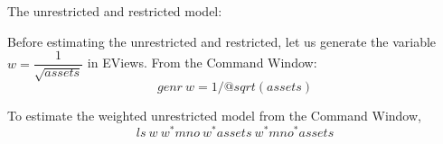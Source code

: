 \documentclass[12pt]{report}
\begin{document}
\noindent The unrestricted and restricted model:

\noindent Before estimating the unrestricted and restricted, let us generate the variable $w = \dfrac{1}{\sqrt{assets}}$ in EViews. From the Command Window: $$genr\ w=1/@sqrt(assets)$$
\begin{figure}[H]
	\centering
\end{figure}
\vspace{-\baselineskip}
\begin{figure}[H]
	\centering
\end{figure}
\vspace{-\baselineskip}

\noindent To estimate the weighted unrestricted model from the Command Window,
$$ls\ w\ w^*mno\ w^*assets\ w^*mno^*assets$$
\begin{figure}[H]
	\centering
\end{figure}
\vspace{-\baselineskip}
\end{document}
